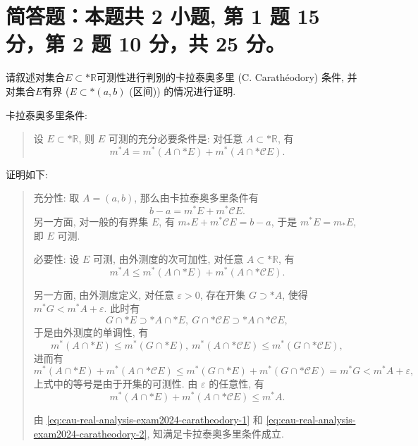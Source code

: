 \section{简答题：本题共 2 小题, 第 1 题 15 分，第 2 题 10 分，共 25 分。}



\begin{question}[points = 15]
请叙述对集合$E \subset* \mathbb{R}$可测性进行判别的卡拉泰奥多里 (C. Carathéodory) 条件, 并对集合$E$有界 ($E \subset* (a, b)$ (区间)) 的情况进行证明.
\end{question}

\begin{solution}
卡拉泰奥多里条件: 

\begin{quote}
设 \(E \subset* \mathbb{R}\), 则 \(E\) 可测的充分必要条件是: 对任意 \(A \subset* \mathbb{R}\), 有
\[m^* A = m^*(A \cap* E) + m^*(A \cap* \mathscr{C} E).\]
\end{quote}

证明如下:

\begin{quote}
充分性: 
取 \(A = (a, b)\), 那么由卡拉泰奥多里条件有
\[b - a = m^* E + m^* \mathscr{C} E.\]
另一方面, 对一般的有界集 \(E\), 有 \(m_* E + m^* \mathscr{C} E = b - a\), 于是 \(m^* E = m_* E\), 即 \(E\) 可测.

必要性: 
设 \(E\) 可测, 由外测度的次可加性, 对任意 \(A \subset* \mathbb{R}\), 有
\begin{equation}
\label{eq:cau-real-analysis-exam2024-caratheodory-1}
m^* A \leqslant m^*(A \cap* E) + m^*(A \cap* \mathscr{C} E).
\end{equation}

另一方面, 由外测度定义, 对任意 \(\varepsilon > 0\), 存在开集 \(G \supset* A\), 使得 \(m^* G < m^* A + \varepsilon\). 此时有
\[G \cap* E \supset* A \cap* E, ~ G \cap* \mathscr{C} E \supset* A \cap* \mathscr{C} E,\]
于是由外测度的单调性, 有
\[m^* (A \cap* E) \leqslant m^* (G \cap* E), ~ m^* (A \cap* \mathscr{C} E) \leqslant m^* (G \cap* \mathscr{C} E),\]
进而有
\[m^* (A \cap* E) + m^* (A \cap* \mathscr{C} E) \leqslant m^* (G \cap* E) + m^* (G \cap* \mathscr{C} E) = m^* G < m^* A + \varepsilon,\]
上式中的等号是由于开集的可测性. 由 \(\varepsilon\) 的任意性, 有
\begin{equation}
\label{eq:cau-real-analysis-exam2024-caratheodory-2}
m^* (A \cap* E) + m^* (A \cap* \mathscr{C} E) \leqslant m^* A.
\end{equation}

由 \eqref{eq:cau-real-analysis-exam2024-caratheodory-1} 和 \eqref{eq:cau-real-analysis-exam2024-caratheodory-2}, 知满足卡拉泰奥多里条件成立.
\end{quote}
\end{solution}

